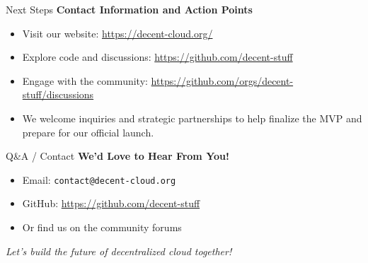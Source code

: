 \documentclass{beamer}
\begin{document}
\begin{frame}{Next Steps}
\textbf{Contact Information and Action Points}
\begin{itemize}
  \item Visit our website: \url{https://decent-cloud.org/}
  \item Explore code and discussions: \url{https://github.com/decent-stuff}
  \item Engage with the community: \url{https://github.com/orgs/decent-stuff/discussions}
  \item We welcome inquiries and strategic partnerships to help finalize the MVP and prepare for our official launch.
\end{itemize}
\end{frame}

\begin{frame}{Q\&A / Contact}
\textbf{We'd Love to Hear From You!} \\
\vspace{0.5em}
\begin{itemize}
  \item Email: \texttt{contact@decent-cloud.org}
  \item GitHub: \url{https://github.com/decent-stuff}
  \item Or find us on the community forums
\end{itemize}

\vspace{1em}
\textit{Let's build the future of decentralized cloud together!}
\end{frame}
\end{document}
